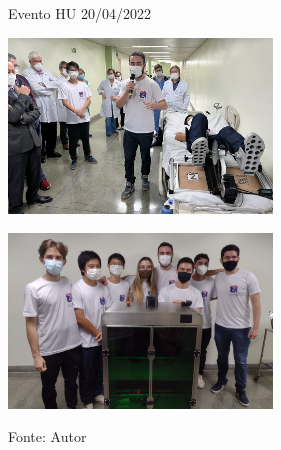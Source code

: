 \documentclass[]{politex}
\begin{document}
\begin{figure}[h]
\centering
    \caption{Evento HU 20/04/2022}
    \begin{minipage}{0.5\textwidth}
       \centering
        
        \centering %
        \includegraphics[width=7cm]{images/evento_hu.jpg}
        
        \label{figura: Apresentação HU}
        
    \end{minipage}\hfill
    \begin{minipage}{0.5\textwidth}
        \centering
        \centering %
        \includegraphics[width=7cm]{images/evento_hu2.jpg}
        \label{figura: Equipe Evento HU}
    \end{minipage}\hfill
    \caption*{Fonte: Autor}
\end{figure}




\end{document}
